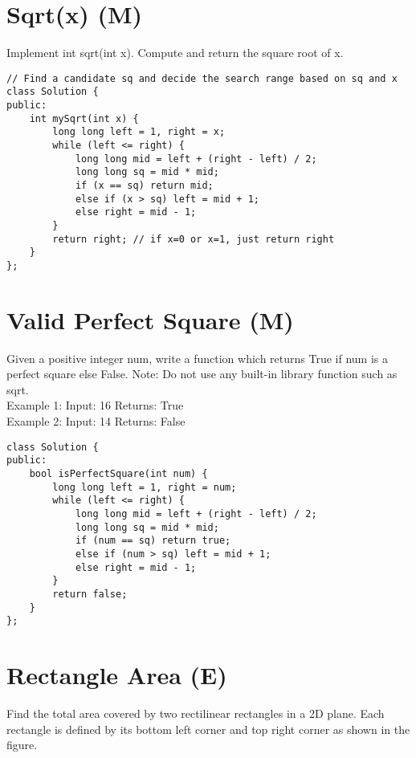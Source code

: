 \section{Sqrt(x) (M)}
Implement int sqrt(int x). Compute and return the square root of x. \\

\begin{lstlisting}
// Find a candidate sq and decide the search range based on sq and x
class Solution {
public:
    int mySqrt(int x) {
        long long left = 1, right = x;
        while (left <= right) {
            long long mid = left + (right - left) / 2;
            long long sq = mid * mid; 
            if (x == sq) return mid;
            else if (x > sq) left = mid + 1;
            else right = mid - 1;
        }
        return right; // if x=0 or x=1, just return right
    }
};
\end{lstlisting}


\section{Valid Perfect Square (M)}
Given a positive integer num, write a function which returns True if num is a perfect square else False. Note: Do not use any built-in library function such as sqrt.\\

Example 1:
Input: 16
Returns: True\\

Example 2:
Input: 14
Returns: False\\

\begin{lstlisting}
class Solution {
public:
    bool isPerfectSquare(int num) {
        long long left = 1, right = num;
        while (left <= right) {
            long long mid = left + (right - left) / 2;
            long long sq = mid * mid; 
            if (num == sq) return true;
            else if (num > sq) left = mid + 1;
            else right = mid - 1;
        }
        return false;     
    }
};
\end{lstlisting}


\section{Rectangle Area (E)}
Find the total area covered by two rectilinear rectangles in a 2D plane. Each rectangle is defined by its bottom left corner and top right corner as shown in the figure. \\

